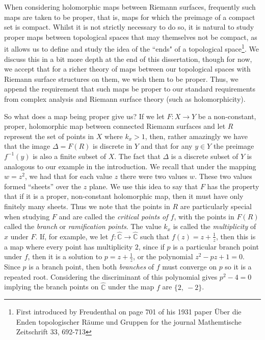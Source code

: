 \documentclass[11pt]{report}
\theoremstyle{definition}
\begin{document}
When considering holomorphic maps between Riemann surfaces, frequently such maps are taken to be proper, that is, maps for which the preimage of a compact set is compact. Whilst it is not strictly necessary to do so, it is natural to study proper maps between topological spaces that may themselves not be compact, as it allows us to define and study the idea of the ``ends" of a topological space\footnote{First introduced by Freudenthal on page 701 of his 1931 paper \"{U}ber die Enden topologischer R\"{a}ume und Gruppen for the journal Mathemtische Zeitschrift 33, 692-713}. We discuss this in a bit more depth at the end of this dissertation, though for now, we accept that for a richer theory of maps between our topological spaces with Riemann surface structures on them, we wish them to be proper. Thus, we append the requirement that such maps be proper to our standard requirements from complex analysis and Riemann surface theory (such as holomorphicity). 

So what does a map being proper give us? If we let $F:X \rightarrow Y$ be a non-constant, proper, holomorphic map between connected Riemann surfaces and let $R$ represent the set of points in $X$ where $k_x > 1$, then, rather amazingly we have that the image $\Delta = F(R)$ is discrete in $Y$ and that for any $y \in Y$ the preimage $f^{-1}(y)$ is also a finite subset of $X$. The fact that $\Delta$ is a discrete subset of $Y$ is analogous to our example in the introduction. We recall that under the mapping $w=z^2$, we had that for each value $z$ there were two values $w$. These two values formed ``sheets'' over the $z$ plane. We use this idea to say that $F$ has the property that if it is a proper, non-constant holomorphic map, then it must have only finitely many sheets. Thus we note that the points in $R$ are particularly special when studying $F$ and are called the \emph{critical points of $f$}, with the points in $F(R)$ called the \emph{branch} or \emph{ramification points}. The value $k_x$ is called the \emph{multiplicity} of $x$ under $F$. If, for example, we let $f:\widehat{\mathbb{C}}\rightarrow \widehat{\mathbb{C}}$ such that $f(z) = z + \frac{1}{z}$, then this is a map where every point has multiplicity $2$, since if $p$ is a particular branch point under $f$, then it is a solution to $p=z + \frac{1}{z}$, or the polynomial $z^2 -pz + 1=0$. Since $p$ is a branch point, then both \emph{branches} of $f$ must converge on $p$ so it is a repeated root. Considering the discriminant of this polynomial gives $p^2 - 4 = 0$ implying the branch points on $\widehat{\mathbb{C}}$ under the map $f$ are $\{2,\ -2\}$.
\end{document}
